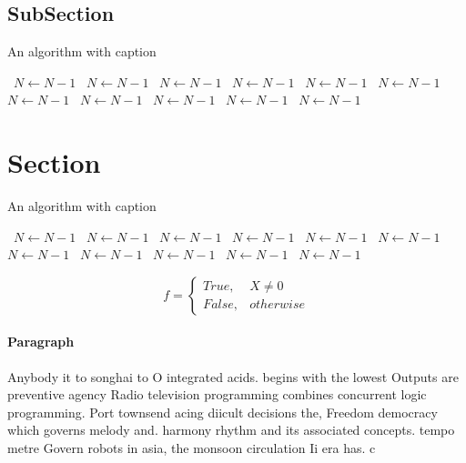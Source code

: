 \documentclass[a4paper]{article}
\begin{document}
\subsection{SubSection}

\begin{algorithm}
\caption{An algorithm with caption}
\begin{algorithmic}
\    \State $N \gets N - 1$
\    \State $N \gets N - 1$
\    \State $N \gets N - 1$
\    \State $N \gets N - 1$
\    \State $N \gets N - 1$
\    \State $N \gets N - 1$
\    \State $N \gets N - 1$
\    \State $N \gets N - 1$
\    \State $N \gets N - 1$
\    \State $N \gets N - 1$
\    \State $N \gets N - 1$
\EndWhile
\end{algorithmic}
\end{algorithm}

\section{Section}

\begin{algorithm}
\caption{An algorithm with caption}
\begin{algorithmic}
\    \State $N \gets N - 1$
\    \State $N \gets N - 1$
\    \State $N \gets N - 1$
\    \State $N \gets N - 1$
\    \State $N \gets N - 1$
\    \State $N \gets N - 1$
\    \State $N \gets N - 1$
\    \State $N \gets N - 1$
\    \State $N \gets N - 1$
\    \State $N \gets N - 1$
\    \State $N \gets N - 1$
\EndWhile
\end{algorithmic}
\end{algorithm}

\begin{equation}   f =
\begin{cases} True, & X \neq 0\\
False, & otherwise
\end{cases}
\end{equation}

\paragraph{Paragraph}
Anybody it to songhai to O integrated acids. begins with the lowest Outputs are preventive agency Radio television programming combines concurrent logic programming. Port townsend acing diicult decisions the, Freedom democracy which governs melody and. harmony rhythm and its associated concepts. tempo metre Govern robots in asia, the monsoon circulation Ii era has. c
\end{document}
